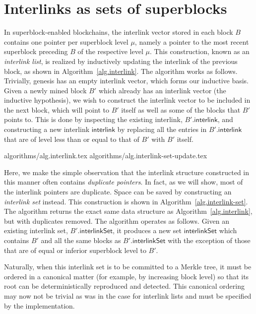 \section{Interlinks as sets of superblocks}\label{sec.construction}

In superblock-enabled blockchains, the interlink vector stored in each block $B$
contains one pointer per superblock level $\mu$, namely a pointer to the most
recent superblock preceding $B$ of the respective level $\mu$. This
construction, known as an \emph{interlink list}, is realized by inductively
updating the interlink of the previous block, as shown in
Algorithm~\ref{alg.interlink}. The algorithm works as follows. Trivially,
genesis has an empty interlink vector, which forms our inductive basis. Given a
newly mined block $B'$ which already has an interlink vector (the inductive
hypothesis), we wish to construct the interlink vector to be included in the
next block, which will point to $B'$ itself as well as some of the blocks that
$B'$ points to. This is done by inspecting the existing interlink,
$B'.\textsf{interlink}$, and constructing a new interlink $\textsf{interlink}$
by replacing all the entries in $B'.\textsf{interlink}$ that are of level less
than or equal to that of $B'$ with $B'$ itself.

{algorithms/alg.interlink.tex}
{algorithms/alg.interlink-set-update.tex}

Here, we make the simple observation that the interlink structure
constructed in this manner often contains \emph{duplicate pointers}. In fact, as
we will show, most of the interlink pointers are duplicate. Space can be saved
by constructing an \emph{interlink set} instead. This construction is shown in
Algorithm~\ref{alg.interlink-set}. The algorithm returns the exact same data
structure as Algorithm~\ref{alg.interlink}, but with duplicates removed. The
algorithm operates as follows. Given an existing interlink set,
$B'.\textsf{interlinkSet}$, it produces a new set $\textsf{interlinkSet}$ which
contains $B'$ and all the same blocks as $B'.\textsf{interlinkSet}$ with the
exception of those that are of equal or inferior superblock level to $B'$.

Naturally, when this interlink set is to be committed to a Merkle tree, it must
be ordered in a canonical matter (for example, by increasing block level) so
that its root can be deterministically reproduced and detected. This canonical
ordering may now not be trivial as was in the case for interlink lists and must
be specified by the implementation.

